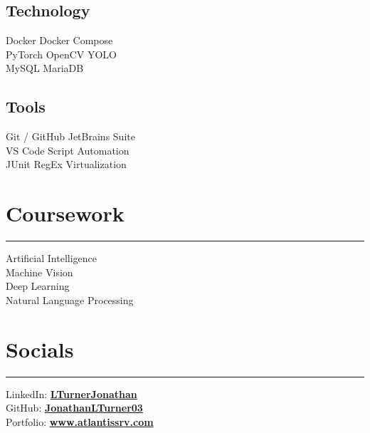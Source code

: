 \documentclass[]{styling}
\begin{document}
{\begin{minipage}[t]{0.33\textwidth}
        \sectionsep

        \subsection{Technology}
        Docker \textbullet{} Docker Compose \\
        PyTorch \textbullet{} OpenCV \textbullet{} YOLO \\
        MySQL \textbullet{} MariaDB \\
         
        \sectionsep
        \vspace{1 em}
        
        \subsection{Tools}
        Git / GitHub \textbullet{} JetBrains Suite \\
        VS Code \textbullet{} Script Automation \\
        JUnit  \textbullet{} RegEx \textbullet{} Virtualization \\
        \sectionsep
        
        
        \section*{Coursework}
        \hrule
        \vspace{1 em}
        Artificial Intelligence \\
        Machine Vision \\
        Deep Learning \\
        Natural Language Processing \\
        \sectionsep
        
    
        
        
        \section*{Socials}
        \hrule
        \vspace{1 em}
        \begin{tabbing}
            LinkedIn: \space \space \= \href{https://www.linkedin.com/in/lturnerjonathan}{\bf LTurnerJonathan} \\
            GitHub: \> \href{https://github.com/JonathanLTurner03}{\bf JonathanLTurner03} \\
            Portfolio: \> \href{https://www.atlantissrv.com}{\bf www.atlantissrv.com} \\
        \end{tabbing}
        \sectionsep
    \end{minipage}
}
%
%
\end{document}
